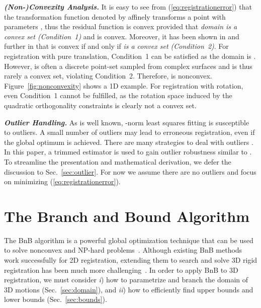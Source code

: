 \documentclass[10pt,journal,cspaper,compsoc]{IEEEtran}
\begin{document}
\vspace{0.06in}
\noindent\textbf{\emph{{(Non-)Convexity Analysis.}}}
It is easy to see from (\ref{eq:registrationerror}) that the transformation function denoted by  affinely transforms a point  with parameters , thus the residual function  is convex provided that \emph{domain  is a convex set (Condition~1)} and  is convex. Moreover, it has been shown in \cite{boyd2004convex} and further in \cite{olsson2009branch} that  is convex if and only if \emph{ is a convex set (Condition~2)}. For registration with pure translation, Condition~1 can be satisfied as the domain  is . However,  is often a discrete point-set sampled from complex surfaces and is thus rarely a convex set, violating Condition~2. Therefore,  is nonconvex. Figure~\ref{fig:nonconvexity} shows a 1D example. For registration with rotation, even Condition~1 cannot be fulfilled, as the rotation space induced by the quadratic orthogonality constraints  is clearly not a convex set.

\vspace{0.06in}
\noindent\textbf{\emph{Outlier Handling.}}
As is well known, -norm least squares fitting is susceptible to outliers.
A small number of outliers may lead to erroneous registration, even if the global optimum is achieved.
There are many strategies to deal with outliers \cite{rusinkiewicz2001efficient,champleboux1992accurate,fitzgibbon2003robust,jian2005robust,chetverikov2005robust}.
In this paper, a trimmed estimator is used to gain outlier robustness similar to \cite{chetverikov2005robust}. To streamline the presentation and mathematical derivation, we defer the discussion to Sec.~\ref{sec:outlier}. For now we assume there are no outliers and focus on minimizing (\ref{eq:registrationerror}).

\section{The Branch and Bound Algorithm}\label{sec:bnb}
The BnB algorithm is a powerful global optimization technique that can be used to solve nonconvex and NP-hard problems~\cite{lawler1966branch}. Although existing BnB methods work successfully for 2D registration, extending them to search  and solve 3D rigid registration has been much more challenging~\cite{breuel2003implementation,li20073d}. In order to apply BnB to 3D registration, we must consider \emph{i}) how to parametrize and branch the domain of 3D motions (Sec.~\ref{sec:domain}), and \emph{ii}) how to efficiently find upper bounds and lower bounds (Sec.~\ref{sec:bounds}).
\end{document}
